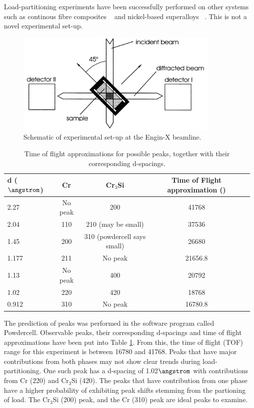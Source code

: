 Load-partitioning experiments have been successfully performed on other systems such as continous fibre composites ~\cite{withers98} and nickel-based superalloys ~\cite{coakley12, dye01}.  This is not a novel experimental set-up.


%
\begin{figure}[htbp]
\begin{center}
\includegraphics[width=10cm]{enginxsetup}
\caption{Schematic of experimental set-up at the Engin-X beamline.}\label{fig:enginxsetup}
\end{center}
\end{figure}
%

%

\begin{table}[htdp]
\begin{center}
\begin{tabular}{lcccc}
\hline
\hline
d ($\angstrom$)		&Cr		&Cr$_3$Si							&Time of Flight approximation (\micro\second)\\
\hline
2.27	&No peak	&200								&41768\\
2.04	&110		&210 (may be small)				&37536\\
1.45	&200		&310 (powdercell says small)		&26680\\
1.177	&211		&No peak							&21656.8\\
1.13	&No peak	&400								&20792 \\
1.02	&220		&420								&18768 \\
0.912	&310		&No peak							&16780.8 \\
\hline
\hline
\end{tabular}
\end{center}
\caption{Time of flight approximations for possible peaks, together with their corresponding d-spacings.}
\label{tab:tof}
\end{table}

The prediction of peaks was performed in the software program called Powdercell.  Observable peaks, their corresponding d-spacings and time of flight approximations have been put into Table \ref{tab:tof}.  From this, the time of flight (TOF) range for this experiment is between 16780 and 41768\micro\second.  Peaks that have major contributions from both phases may not show clear trends during load-partitioning.  One such peak has a d-spacing of 1.02$\angstrom$ with contributions from Cr (220) and Cr$_3$Si (420).  The peaks that have contribution from one phase have a higher probability of exhibiting peak shifts stemming from the partioning of load.  The Cr$_3$Si (200) peak, and the Cr (310) peak are ideal peaks to examine.  

